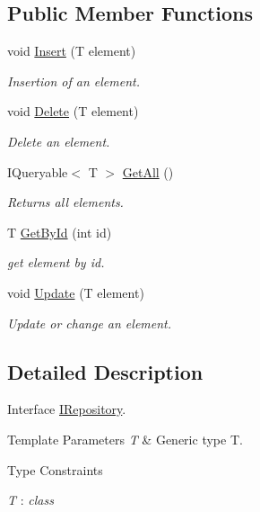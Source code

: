 \subsection*{Public Member Functions}
\begin{DoxyCompactItemize}
\item 
void \mbox{\hyperlink{interface_game_1_1_i_repository_a07afb17fde8c49eb4bfd61e031c4b76c}{Insert}} (T element)
\begin{DoxyCompactList}\small\item\em Insertion of an element. \end{DoxyCompactList}\item 
void \mbox{\hyperlink{interface_game_1_1_i_repository_a756ad6d919f5ae70d0800a63227b77a0}{Delete}} (T element)
\begin{DoxyCompactList}\small\item\em Delete an element. \end{DoxyCompactList}\item 
I\+Queryable$<$ T $>$ \mbox{\hyperlink{interface_game_1_1_i_repository_a92cb62ff8c11bfb4a4effc1c7fec7954}{Get\+All}} ()
\begin{DoxyCompactList}\small\item\em Returns all elements. \end{DoxyCompactList}\item 
T \mbox{\hyperlink{interface_game_1_1_i_repository_a83cea424c282f311a64d650dc3adfcc5}{Get\+By\+Id}} (int id)
\begin{DoxyCompactList}\small\item\em get element by id. \end{DoxyCompactList}\item 
void \mbox{\hyperlink{interface_game_1_1_i_repository_a5482bc216e74fc42127e933df0e433c2}{Update}} (T element)
\begin{DoxyCompactList}\small\item\em Update or change an element. \end{DoxyCompactList}\end{DoxyCompactItemize}


\subsection{Detailed Description}
Interface \mbox{\hyperlink{interface_game_1_1_i_repository}{I\+Repository}}. 


\begin{DoxyTemplParams}{Template Parameters}
{\em T} & Generic type T.\\
\hline
\end{DoxyTemplParams}
\begin{Desc}
\item[Type Constraints]\begin{description}
\item[{\em T} : {\em class}]\end{description}
\end{Desc}


